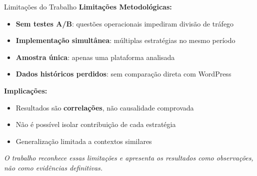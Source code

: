 \documentclass{beamer}
\begin{document}
    \begin{frame}{Limitações do Trabalho}
        \textbf{Limitações Metodológicas:}
        \begin{itemize}
            \item \textbf{Sem testes A/B}: questões operacionais impediram divisão de tráfego
            \item \textbf{Implementação simultânea}: múltiplas estratégias no mesmo período
            \item \textbf{Amostra única}: apenas uma plataforma analisada
            \item \textbf{Dados históricos perdidos}: sem comparação direta com WordPress
        \end{itemize}

        \vspace{0.4cm}

        \textbf{Implicações:}
        \begin{itemize}
            \item Resultados são \textbf{correlações}, não causalidade comprovada
            \item Não é possível isolar contribuição de cada estratégia
            \item Generalização limitada a contextos similares
        \end{itemize}

        \vspace{0.3cm}

        \textit{O trabalho reconhece essas limitações e apresenta os resultados como observações, não como evidências definitivas.}
    \end{frame}
\end{document}
